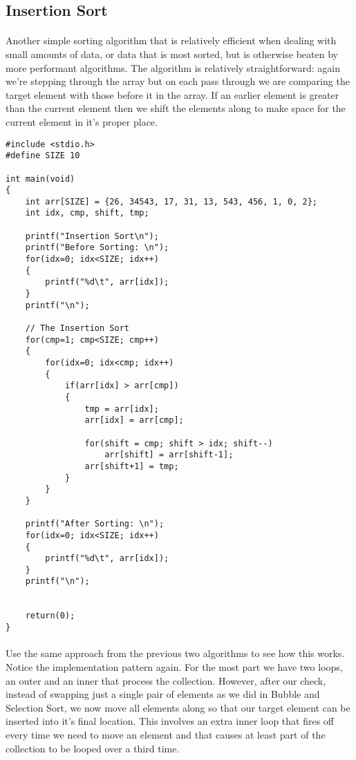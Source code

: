\documentclass[10pt, a4paper, twosize]{article}
\begin{document}
\subsection{Insertion Sort}

\paragraph{} Another simple sorting algorithm that is relatively efficient when dealing with small amounts of data, or data that is most sorted, but is otherwise beaten by more performant algorithms. The algorithm is relatively straightforward: again we're stepping through the array but on each pass through we are comparing the target element with those before it in the array. If an earlier element is greater than the current element then we shift the elements along to make space for the current element in it's proper place.

\begin{lstlisting}
#include <stdio.h>
#define SIZE 10

int main(void)
{
    int arr[SIZE] = {26, 34543, 17, 31, 13, 543, 456, 1, 0, 2};
    int idx, cmp, shift, tmp;

    printf("Insertion Sort\n");
    printf("Before Sorting: \n");
    for(idx=0; idx<SIZE; idx++)
    {
        printf("%d\t", arr[idx]);
    }
    printf("\n");

    // The Insertion Sort
    for(cmp=1; cmp<SIZE; cmp++)
    {
        for(idx=0; idx<cmp; idx++)
        {
            if(arr[idx] > arr[cmp])
            {
                tmp = arr[idx];
                arr[idx] = arr[cmp];

                for(shift = cmp; shift > idx; shift--)
                    arr[shift] = arr[shift-1];
                arr[shift+1] = tmp;
            }
        }
    }

    printf("After Sorting: \n");
    for(idx=0; idx<SIZE; idx++)
    {
        printf("%d\t", arr[idx]);
    }
    printf("\n");


    return(0);
}
\end{lstlisting}

\paragraph{} Use the same approach from the previous two algorithms to see how this works. Notice the implementation pattern again. For the most part we have two loops, an outer and an inner that process the collection. However, after our check, instead of swapping just a single pair of elements as we did in Bubble and Selection Sort, we now move all elements along so that our target element can be inserted into it's final location. This involves an extra inner loop that fires off every time we need to move an element and that causes at least part of the collection to be looped over a third time.
\end{document}
